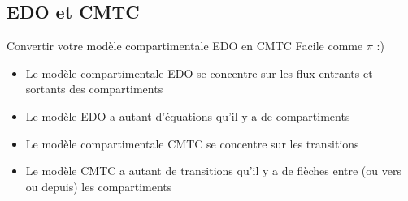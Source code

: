 \documentclass[aspectratio=169]{beamer}\usepackage[]{graphicx}\usepackage[]{xcolor}
\begin{document}
%
%
%



\subsection{EDO et CMTC}


\begin{frame}{Convertir votre modèle compartimentale EDO en CMTC}
    Facile comme $\pi$ :)
\vfill
\begin{itemize}
    \item Le modèle compartimentale EDO se concentre sur les flux entrants et sortants des compartiments
    \vfill
    \item Le modèle EDO a autant d'équations qu'il y a de compartiments
    \vfill
    \item Le modèle compartimentale CMTC se concentre sur les transitions
    \vfill
    \item Le modèle CMTC a autant de transitions qu'il y a de flèches entre (ou vers ou depuis) les compartiments
\end{itemize}
\end{frame}
\end{document}
